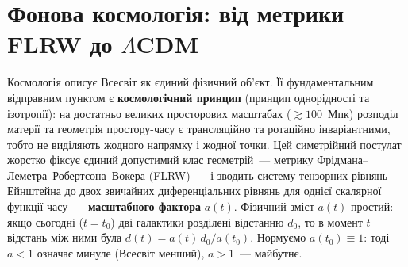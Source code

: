 
\chapter{Фонова космологія: від метрики FLRW до $\Lambda$CDM}
\label{sec:friedmann}

Космологія описує Всесвіт як єдиний фізичний об'єкт. Її фундаментальним
відправним пунктом є \textbf{космологічний принцип} (принцип однорідності та ізотропії):
на достатньо великих просторових масштабах ($\gtrsim 100$~Мпк) розподіл
матерії та геометрія простору-часу є трансляційно та ротаційно інваріантними, тобто
не виділяють жодного напрямку і жодної точки. Цей симетрійний постулат
жорстко фіксує єдиний допустимий клас геометрій~--- метрику
Фрідмана--Леметра--Робертсона--Вокера (FLRW)~--- і зводить систему тензорних
рівнянь Ейнштейна до двох звичайних диференціальних рівнянь для однієї скалярної
функції часу~--- \textbf{масштабного фактора} $a(t)$.
Фізичний зміст $a(t)$ простий: якщо сьогодні ($t = t_0$) дві галактики
розділені відстанню $d_0$, то в момент $t$ відстань між ними була
$d(t) = a(t)\,d_0/a(t_0)$.
Нормуємо $a(t_0) \equiv 1$: тоді $a < 1$ означає минуле
(Всесвіт менший), $a > 1$~--- майбутнє.

